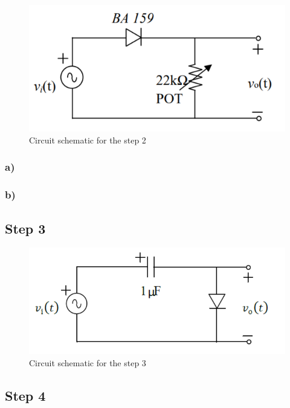 \documentclass[letterpaper,12pt]{article}
\begin{document}
\begin{figure}[H]
    \centering
    \includegraphics[width=1\textwidth]{2_1.png}
    \caption{Circuit schematic for the step 2}
\end{figure} 
    
\subsubsection{a)}
\subsubsection{b)}


\subsection{Step 3}

\begin{figure}[H]
    \centering
    \includegraphics[width=1\textwidth]{3_1.png}
    \caption{Circuit schematic for the step 3}
\end{figure} 
    
    

\subsection{Step 4}
\end{document}
